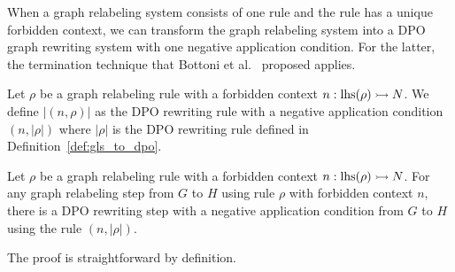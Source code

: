 When a graph relabeling system consists of one rule and the rule has a unique forbidden context, we can transform the graph relabeling system into a DPO graph rewriting system with one negative application condition. For the latter, the termination technique that Bottoni et al.~\cite{bottoni2010atermination} proposed applies. 
\begin{definition}
    Let $\rho$ be a graph relabeling rule with a forbidden context $n:\operatorname{lhs}(\rho) \rightarrowtail N$.
      We define $|(n,\rho)|$ as the DPO rewriting rule with a negative application condition $(n, |\rho|)$
    where $|\rho|$ is the DPO rewriting rule defined in Definition~\ref{def:gls_to_dpo}.
\end{definition}  

\begin{theorem}
    \label{prop:fcgls_to_dpogrs_with_one_nac}
   Let $\rho$ be a graph relabeling rule with a forbidden context $n:\operatorname{lhs}(\rho) \rightarrowtail N$.
    For any graph relabeling step from $G$ to $H$ using rule $\rho$ with forbidden context $n$, there is a DPO rewriting step with a negative application condition from $G$ to $H$ using the rule $(n, |\rho|)$.
\end{theorem}
The proof is straightforward by definition.